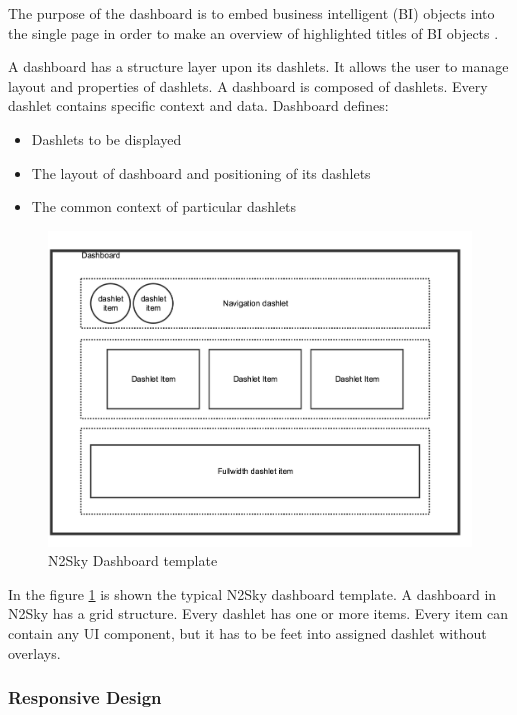 The purpose of the dashboard is to embed business intelligent (BI) objects into the single page in order to make an overview of highlighted titles of BI objects \cite{dashboards_book}.

A dashboard has a structure layer upon its dashlets. It allows the user to manage layout and properties of dashlets. A dashboard is composed of dashlets. Every dashlet contains specific context and data. Dashboard defines: 
\begin{itemize}
\item Dashlets to be displayed
\item The layout of dashboard and positioning of its dashlets
\item The common context of particular dashlets
\end{itemize}


\begin{figure}[H]
\begin{center}
  \includegraphics[width=\linewidth]{components/3/components/dashboard_template.png}
  \caption{N2Sky Dashboard template}
  \label{fig:dashboard_template}
\end{center}
\end{figure}

In the figure \ref{fig:dashboard_template} is shown the typical N2Sky dashboard template. A dashboard in N2Sky has a grid structure. Every dashlet has one or more items. Every item can contain any UI component, but it has to be feet into assigned dashlet without overlays. 



\subsubsection{Responsive Design}\label{Responsive design}

